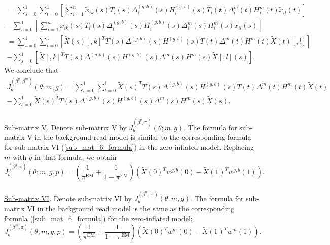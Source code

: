 \documentclass[12pt]{article}
\begin{document}
\begin{multline*}
\\ = \sum_{s=0}^1 \sum_{t=0}^1 \left[\sum_{i=1}^n \tilde{x}_{ik}(s) T_i(s) {\Delta}^{(g,b)}_i(s) {H}^{(g,b)}_i(s) T_i(t){\Delta}^m_i(t) {H}^m_i(t) \tilde{x}_{il}(t) \right]
\\ - \sum_{s=0}^1 \left[\sum_{i=1}^n \tilde{x}_{ik}(s) T_i(s) {\Delta}^{(g,b)}_i(s) {H}^{(g,b)}_i(s) {\Delta}^m_i(s) {H}^m_i(s) \tilde{x}_{il}(s)\right] 
\\ = \sum_{s=0}^1 \sum_{t=0}^1 \left[ \tilde{X}(s)[,k]^T {T}(s) {\Delta}^{(g,b)}(s) {H}^{(g,b)}(s) {T}(t){\Delta}^m(t) {H}^m(t) \tilde{X}(t)[,l] \right]\\ - \sum_{s=0}^1 \left[ \tilde{X}[,k]^T {T}(s) {\Delta}^{(g,b)}(s) {H}^{(g,b)}(s) {\Delta}^m(s) {H}^m(s) \tilde{X}[,l](s)\right].
\end{multline*}
We conclude that
\begin{multline}\label{sub_mat_4_formula_background}
J^{(\beta^g, \beta^m)}_b(\theta; m, g) = \sum_{s=0}^1 \sum_{t=0}^1 \tilde{X}(s)^T  {T}(s) {\Delta}^{(g,b)}(s) {H}^{(g,b)}(s) {T}(t){\Delta}^m(t) {H}^m(t) \tilde{X}(t) \\ - \sum_{s=0}^1 \tilde{X}(s)^T {T}(s) {\Delta}^{(g,b)}(s) {H}^{(g,b)}(s) {\Delta}^m(s) {H}^m(s) \tilde{X}(s).
\end{multline}
\\ \noindent
\underline{Sub-matrix V}. Denote sub-matrix V by $J_b^{(\beta^g, \pi)}( \theta; m ,g)$. The formula for sub-matrix V in the background read model is similar to the corresponding formula for sub-matrix VI (\ref{sub_mat_6_formula}) in the zero-inflated model. Replacing $m$ with $g$ in that formula, we obtain
\begin{equation}\label{sub_mat_5_formula_background}
 J^{(\beta^g, \pi)}_b(\theta; m, g, p) = \left( \frac{1}{\pi^\textrm{EM}} + \frac{1}{1 - \pi^\textrm{EM}} \right) \left( \tilde{X}(0)^T w^{g,b}(0) - \tilde{X}(1)^T w^{g,b}(1)\right).
\end{equation}
\\ \noindent
\underline{Sub-matrix VI}. Denote sub-matrix VI by $J_b^{(\beta^m, \pi)}(\theta; m, g)$. The formula for sub-matrix VI in the background read model is the same as the corresponding formula (\ref{sub_mat_6_formula}) for the zero-inflated model:
\begin{equation}\label{sub_mat_6_formula_background}
 J^{(\beta^m, \pi)}_b(\theta; m, g, p) = \left(\frac{1}{\pi^\textrm{EM}} + \frac{1}{1 - \pi^\textrm{EM}} \right) \left( \tilde{X}(0)^T w^{m}(0) - \tilde{X}(1)^T w^{m}(1)\right).
\end{equation}
\end{document}

